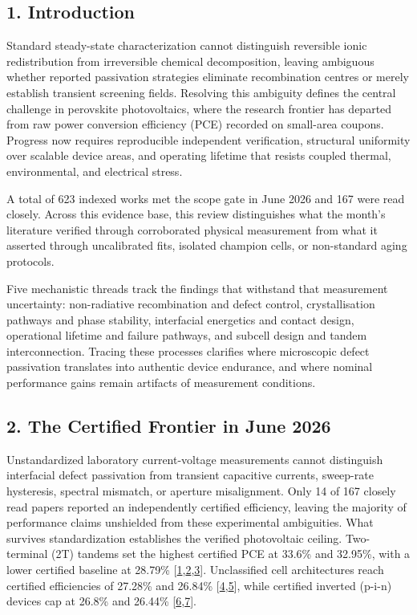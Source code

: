 \documentclass[
  11pt,
]{article}
\begin{document}
\subsection{1. Introduction}\label{introduction}

Standard steady-state characterization cannot distinguish reversible
ionic redistribution from irreversible chemical decomposition, leaving
ambiguous whether reported passivation strategies eliminate
recombination centres or merely establish transient screening fields.
Resolving this ambiguity defines the central challenge in perovskite
photovoltaics, where the research frontier has departed from raw power
conversion efficiency (PCE) recorded on small-area coupons. Progress now
requires reproducible independent verification, structural uniformity
over scalable device areas, and operating lifetime that resists coupled
thermal, environmental, and electrical stress.

A total of 623 indexed works met the scope gate in June 2026 and 167
were read closely. Across this evidence base, this review distinguishes
what the month's literature verified through corroborated physical
measurement from what it asserted through uncalibrated fits, isolated
champion cells, or non-standard aging protocols.

Five mechanistic threads track the findings that withstand that
measurement uncertainty: non-radiative recombination and defect control,
crystallisation pathways and phase stability, interfacial energetics and
contact design, operational lifetime and failure pathways, and subcell
design and tandem interconnection. Tracing these processes clarifies
where microscopic defect passivation translates into authentic device
endurance, and where nominal performance gains remain artifacts of
measurement conditions.

\subsection{2. The Certified Frontier in June
2026}\label{the-certified-frontier-in-june-2026}

Unstandardized laboratory current-voltage measurements cannot
distinguish interfacial defect passivation from transient capacitive
currents, sweep-rate hysteresis, spectral mismatch, or aperture
misalignment. Only 14 of 167 closely read papers reported an
independently certified efficiency, leaving the majority of performance
claims unshielded from these experimental ambiguities. What survives
standardization establishes the verified photovoltaic ceiling.
Two-terminal (2T) tandems set the highest certified PCE at 33.6\% and
32.95\%, with a lower certified baseline at 28.79\%
{[}\href{https://doi.org/10.1126/science.aef5355}{1},\href{https://doi.org/10.1038/s41467-026-73276-w}{2},\href{https://doi.org/10.1002/anie.4918900}{3}{]}.
Unclassified cell architectures reach certified efficiencies of 27.28\%
and 26.84\%
{[}\href{https://doi.org/10.1126/sciadv.aef6596}{4},\href{https://doi.org/10.1038/s41467-026-74107-8}{5}{]},
while certified inverted (p-i-n) devices cap at 26.8\% and 26.44\%
{[}\href{https://doi.org/10.1002/adma.73855}{6},\href{https://doi.org/10.1021/acsenergylett.6c01257}{7}{]}.
\end{document}

